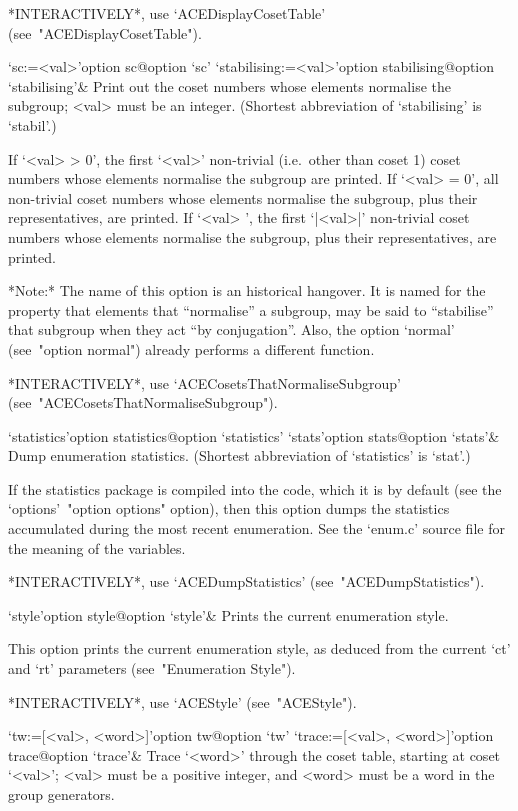 *INTERACTIVELY*,              use               `ACEDisplayCosetTable'
(see~"ACEDisplayCosetTable").

\>`sc:=<val>'{option sc}@{option `sc'}
\>`stabilising:=<val>'{option stabilising}@{option `stabilising'}&
Print out the coset numbers whose elements normalise the subgroup; 
<val> must be an integer.
(Shortest abbreviation of `stabilising' is `stabil'.)

If `<val> > 0', the first `<val>' non-trivial (i.e.~other  than  coset
1) coset numbers whose elements normalise the subgroup are printed. If
`<val> = 0', all non-trivial coset numbers  whose  elements  normalise
the subgroup, plus their representatives, are printed.  If  `<val>  ', the first  `|<val>|'  non-trivial  coset  numbers  whose  elements
normalise the subgroup, plus their representatives, are printed.

*Note:*
The name of this option is an historical hangover. It is named for the
property that elements that ``normalise'' a subgroup, may be  said  to
``stabilise'' that subgroup when they act  ``by  conjugation''.  Also,
the option `normal' (see~"option normal") already performs a different
function.

*INTERACTIVELY*,         use          `ACECosetsThatNormaliseSubgroup'
(see~"ACECosetsThatNormaliseSubgroup").

\>`statistics'{option statistics}@{option `statistics'}
\>`stats'{option stats}@{option `stats'}&
Dump enumeration statistics.
(Shortest abbreviation of `statistics' is `stat'.)

If the statistics package is compiled into the {\ACE} code,  which  it
is by default (see the `options'~"option options" option),  then  this
option  dumps  the  statistics  accumulated  during  the  most  recent
enumeration. See the `enum.c' source  file  for  the  meaning  of  the
variables.

*INTERACTIVELY*, use `ACEDumpStatistics' (see~"ACEDumpStatistics").

\>`style'{option style}@{option `style'}&
Prints the current enumeration style.

This option prints the current enumeration style, as deduced from  the
current `ct' and `rt' parameters (see~"Enumeration Style").

*INTERACTIVELY*, use `ACEStyle' (see~"ACEStyle").

\>`tw:=[<val>, <word>]'{option tw}@{option `tw'}
\>`trace:=[<val>, <word>]'{option trace}@{option `trace'}&
Trace `<word>' through the coset table,  starting  at  coset  `<val>';
<val> must be a positive integer, and <word> must be  a  word  in  the
group generators.

